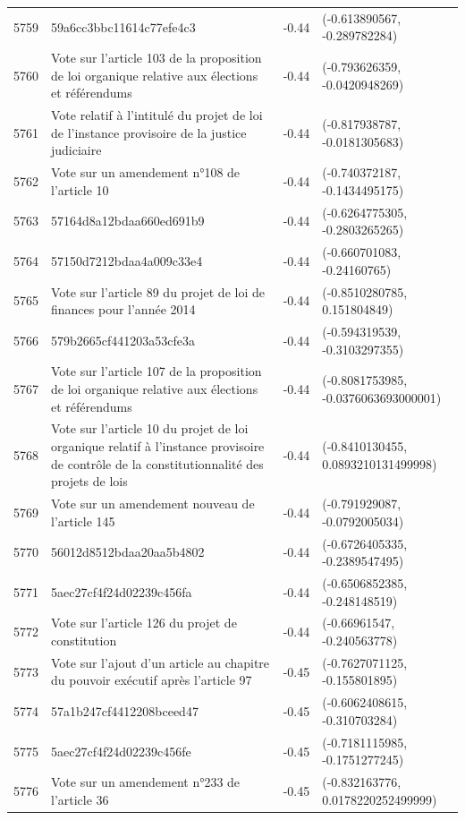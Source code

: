 \begin{table}[ht]
\begin{tabular}{rlrl}
  5759 & 59a6cc3bbc11614c77efe4c3 & -0.44 & (-0.613890567, -0.289782284) \\ 
  5760 & Vote sur l'article 103 de la proposition de loi organique relative aux élections et référendums & -0.44 & (-0.793626359, -0.0420948269) \\ 
  5761 & Vote relatif à l'intitulé du projet de loi de l'instance provisoire de la justice judiciaire & -0.44 & (-0.817938787, -0.0181305683) \\ 
  5762 & Vote sur un amendement n°108 de l'article 10 & -0.44 & (-0.740372187, -0.1434495175) \\ 
  5763 & 57164d8a12bdaa660ed691b9 & -0.44 & (-0.6264775305, -0.2803265265) \\ 
  5764 & 57150d7212bdaa4a009c33e4 & -0.44 & (-0.660701083, -0.24160765) \\ 
  5765 & Vote sur l'article 89 du projet de loi de finances pour l'année 2014 & -0.44 & (-0.8510280785, 0.151804849) \\ 
  5766 & 579b2665cf441203a53cfe3a & -0.44 & (-0.594319539, -0.3103297355) \\ 
  5767 & Vote sur l'article 107 de la proposition de loi organique relative aux élections et référendums & -0.44 & (-0.8081753985, -0.0376063693000001) \\ 
  5768 & Vote sur l'article 10 du projet de loi organique relatif à l'instance provisoire de contrôle de la constitutionnalité des projets de lois & -0.44 & (-0.8410130455, 0.0893210131499998) \\ 
  5769 & Vote sur un amendement nouveau de l'article 145 & -0.44 & (-0.791929087, -0.0792005034) \\ 
  5770 & 56012d8512bdaa20aa5b4802 & -0.44 & (-0.6726405335, -0.2389547495) \\ 
  5771 & 5aec27cf4f24d02239c456fa & -0.44 & (-0.6506852385, -0.248148519) \\ 
  5772 & Vote sur l'article 126 du projet de constitution & -0.44 & (-0.66961547, -0.240563778) \\ 
  5773 & Vote sur l'ajout d'un article au chapitre du pouvoir exécutif après l'article 97 & -0.45 & (-0.7627071125, -0.155801895) \\ 
  5774 & 57a1b247cf4412208bceed47 & -0.45 & (-0.6062408615, -0.310703284) \\ 
  5775 & 5aec27cf4f24d02239c456fe & -0.45 & (-0.7181115985, -0.1751277245) \\ 
  5776 & Vote sur un amendement n°233 de l'article 36 & -0.45 & (-0.832163776, 0.0178220252499999) \\ 

\end{tabular}
\end{table}
